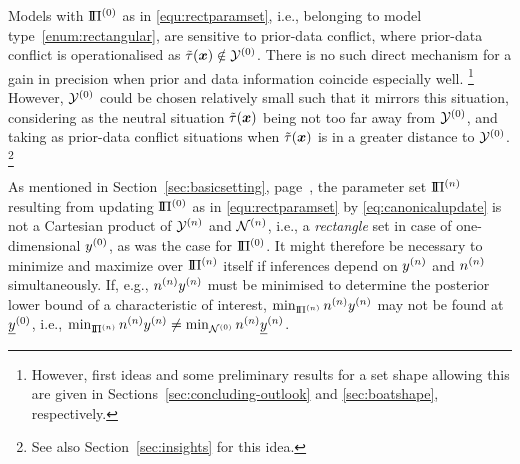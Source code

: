 
Models with $\text{I}\!\Pi^{(0)}$ as in \eqref{equ:rectparamset}, %
i.e., belonging to model type~\eqref{enum:rectangular},
are sensitive to prior-data conflict,
where prior-data conflict is operationalised as $\tilde{\tau}({\bm x}) \notin \mathcal{Y}^{(0)}$.
There is no such direct mechanism for a gain in precision when prior and data information coincide especially well.%
\footnote{However, first ideas and some preliminary results for a set shape allowing this
are given in Sections~\ref{sec:concluding-outlook} and \ref{sec:boatshape}, respectively.}
However, $\mathcal{Y}^{(0)}$ could be chosen relatively small such that it mirrors this situation,
considering as the neutral situation $\tilde{\tau}({\bm x})$ being not too far away from $\mathcal{Y}^{(0)}$,
and taking as prior-data conflict situations when $\tilde{\tau}({\bm x})$ is in a greater distance to $\mathcal{Y}^{(0)}$.%
\footnote{See also Section~\ref{sec:insights} for this idea.}

As mentioned in Section~\ref{sec:basicsetting}, page~\pageref{enum:rectangular},
the parameter set $\text{I}\!\Pi^{(n)}$ resulting from updating $\text{I}\!\Pi^{(0)}$ as in \eqref{equ:rectparamset}
by \eqref{eq:canonicalupdate} is not a Cartesian product of $\mathcal{Y}^{(n)}$ and $\mathcal{N}^{(n)}$,
i.e., a \emph{rectangle} set in case of one-dimensional $y^{(0)}$, as was the case for $\text{I}\!\Pi^{(0)}$.
It might therefore be necessary to minimize and maximize over $\text{I}\!\Pi^{(n)}$ itself if inferences depend on $y^{(n)}$ and $n^{(n)}$ simultaneously.
If, e.g., $n^{(n)}y^{(n)}$ must be minimised to determine the posterior lower bound of a characteristic of interest,
$\min_{\text{I}\!\Pi^{(n)}} n^{(n)}y^{(n)}$ may not be found at $\underline{y}^{(0)}$, i.e., $\min_{\text{I}\!\Pi^{(n)}} n^{(n)}y^{(n)} \not = \min_{\mathcal{N}^{(0)}} n^{(n)}\underline{y}^{(n)}$.

